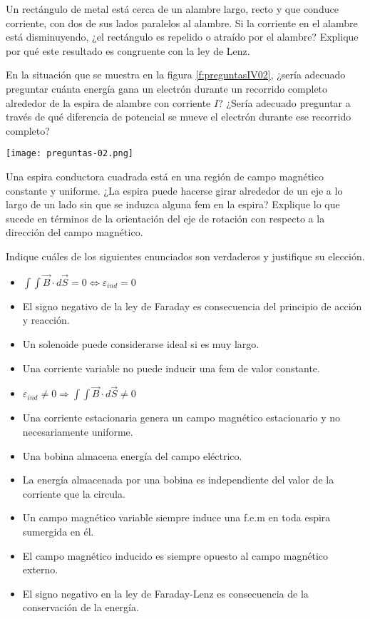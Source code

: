%
\begin{Exercise}
    Un rectángulo de metal está cerca de un alambre largo, recto y que conduce corriente, con dos de sus lados paralelos al alambre. Si la corriente en el alambre está disminuyendo, ¿el rectángulo es repelido o atraído por el alambre? Explique por qué este resultado es congruente con la ley de Lenz.
\end{Exercise}
%
\begin{Exercise}\label{p:preguntasIV02}
    En la situación que se muestra en la figura \ref{f:preguntasIV02}, ¿sería adecuado preguntar cuánta energía gana un electrón durante un recorrido completo alrededor de la espira de alambre con corriente $I$? ¿Sería adecuado preguntar a través de qué diferencia de potencial se mueve el electrón durante ese recorrido completo?
\end{Exercise}
%
\begin{center}
    \texttt{[image: preguntas-02.png]}
\end{center}
%
\begin{Exercise}
    Una espira conductora cuadrada está en una región de campo magnético constante y uniforme. ¿La espira puede hacerse girar alrededor de un eje a lo largo de un lado sin que se induzca alguna fem en la espira? Explique lo que sucede en términos de la orientación del eje de rotación con respecto a la dirección del campo magnético.
\end{Exercise}
%
\begin{Exercise}
    Indique cuáles de los siguientes enunciados son verdaderos y justifique su elección.
    \begin{itemize}
        \item $\int\int \vec{B} \cdot d\vec{S} = 0 \Leftrightarrow \varepsilon_{ind} = 0$
        \item El signo negativo de la ley de Faraday es consecuencia del principio de acción y reacción.
        \item Un solenoide puede considerarse ideal si es muy largo.
        \item Una corriente variable no puede inducir una fem de valor constante.
        \item $\varepsilon_{ind} \neq 0 \Rightarrow \int\int \vec{B} \cdot d\vec{S} \neq 0$
        \item Una corriente estacionaria genera un campo magnético estacionario y no necesariamente uniforme.
        \item Una bobina almacena energía del campo eléctrico.
        \item La energía almacenada por una bobina es independiente del valor de la corriente que la circula.
        \item Un campo magnético variable siempre induce una f.e.m en toda espira sumergida en él.
        \item El campo magnético inducido es siempre opuesto al campo magnético externo.
        \item El signo negativo en la ley de Faraday-Lenz es consecuencia de la conservación de la energía.
    \end{itemize}
\end{Exercise}
